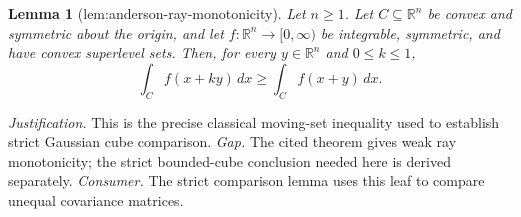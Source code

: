\documentclass{article}
\newtheorem{lemma}{Lemma}
\begin{document}
\begin{lemma}[lem:anderson-ray-monotonicity]\label{lem:anderson-ray-monotonicity}
Let \(n\geq1\).  Let \(C\subseteq\mathbb R^n\) be convex and symmetric about the origin, and let \(f:\mathbb R^n\to[0,\infty)\) be integrable, symmetric, and have convex superlevel sets.  Then, for every \(y\in\mathbb R^n\) and \(0\leq k\leq1\),
\[
 \int_C f(x+ky)\,dx\geq \int_C f(x+y)\,dx.
\]
\end{lemma}
\par\smallskip\noindent \textit{Justification.} This is the precise classical moving-set inequality used to establish strict Gaussian cube comparison. \textit{Gap.} The cited theorem gives weak ray monotonicity; the strict bounded-cube conclusion needed here is derived separately. \textit{Consumer.} The strict comparison lemma uses this leaf to compare unequal covariance matrices.
\end{document}
